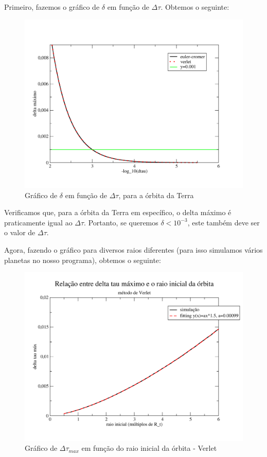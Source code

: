 \documentclass[12pt,a4paper]{article}
\begin{document}
Primeiro, fazemos o gráfico de $\delta$ em função de $\Delta\tau$. Obtemos o seguinte:

\begin{figure}[H]
\includegraphics[width=\linewidth]{../tarefa-1c/grafico_deltas.png}
\caption{Gráfico de $\delta$ em função de $\Delta\tau$, para a órbita da Terra}
\end{figure}

Verificamos que, para a órbita da Terra em específico, o delta máximo é praticamente igual ao $\Delta\tau$. Portanto, se queremos $\delta < 10^{-3}$, este também deve ser o valor de $\Delta\tau$.

Agora, fazendo o gráfico para diversos raios diferentes (para isso simulamos vários planetas no nosso programa), obtemos o seguinte:

\begin{figure}[H]
\includegraphics[width=\linewidth]{../tarefa-1c/grafico_dtaumax_bom_verlet.png}
\caption{Gráfico de $\Delta\tau_{max}$ em função do raio inicial da órbita - Verlet}
\end{figure}
\end{document}
